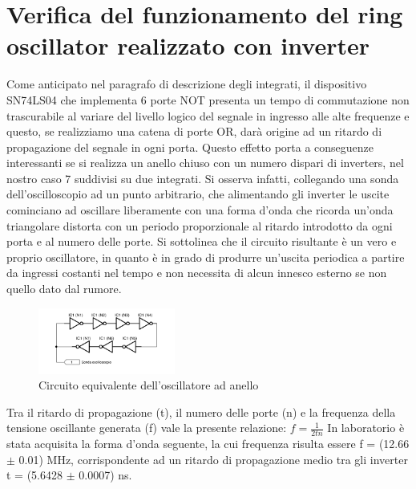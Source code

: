 \documentclass[journal]{IEEEtran}
\begin{document}

\section{Verifica del funzionamento del ring oscillator realizzato con inverter}
Come anticipato nel paragrafo di descrizione degli integrati, il dispositivo SN74LS04 che implementa 6 porte NOT presenta un tempo di commutazione non trascurabile al variare del livello logico del segnale in ingresso alle alte frequenze e questo, se realizziamo una catena di porte OR, darà origine ad un ritardo di propagazione del segnale in ogni porta. 
Questo effetto porta a conseguenze interessanti se si realizza un anello chiuso con un numero dispari di inverters, nel nostro caso 7 suddivisi su due integrati. Si osserva infatti, collegando una sonda dell'oscilloscopio ad un punto arbitrario, che alimentando gli inverter le uscite cominciano ad oscillare liberamente con una forma d'onda che ricorda un'onda triangolare distorta con un periodo proporzionale al ritardo introdotto da ogni porta e al numero delle porte. Si sottolinea che il circuito risultante è un vero e proprio oscillatore, in quanto è in grado di produrre un'uscita periodica a partire da ingressi costanti nel tempo e non necessita di alcun innesco esterno se non quello dato dal rumore.

\begin{figure}[H]%
\begin{center}
\includegraphics[width=0.40\textwidth]{sch-simulations/digital/output/ring-osc-logic.pdf}
\caption{Circuito equivalente dell'oscillatore ad anello}
\label{fig:circuit_ring_oscillator}
\end{center}
\end{figure}

Tra il ritardo di propagazione (t), il numero delle porte (n) e la frequenza della tensione oscillante generata (f) vale la presente relazione: 
\begin{math}
f = \frac{1}{2tn}
\end{math}
In laboratorio è stata acquisita la forma d'onda seguente, la cui frequenza risulta essere f = (12.66 $\pm$ 0.01) MHz, corrispondente ad un ritardo di propagazione medio tra gli inverter t = (5.6428 $\pm$ 0.0007) ns.
\end{document}
